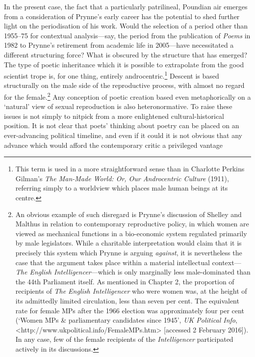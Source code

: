 \documentclass[]{article}
\begin{document}
In the present case, the fact that a particularly patrilineal, Poundian
air emerges from a consideration of Prynne’s early career has the
potential to shed further light on the periodisation of his work. Would
the selection of a period other than 1955–75 for contextual
analysis—say, the period from the publication of \emph{Poems} in 1982 to
Prynne’s retirement from academic life in 2005—have necessitated a
different structuring force? What is obscured by the structure that has
emerged? The type of poetic inheritance which it is possible to
extrapolate from the good scientist trope is, for one thing, entirely
androcentric.\footnote{This term is used in a more straightforward sense
  than in Charlotte Perkins Gilman’s \emph{The Man-Made World: Or, Our
  Androcentric Culture} (1911), referring simply to a worldview which
  places male human beings at its centre.} Descent is based structurally
on the male side of the reproductive process, with almost no regard for
the female.\footnote{An obvious example of such disregard is Prynne’s
  discussion of Shelley and Malthus in relation to contemporary
  reproductive policy, in which women are viewed as mechanical functions
  in a bio-economic system regulated primarily by male legislators.
  While a charitable interpretation would claim that it is precisely
  this system which Prynne is arguing \emph{against}, it is nevertheless
  the case that the argument takes place within a material intellectual
  context—\emph{The English Intelligencer}—which is only marginally less
  male-dominated than the 44th Parliament itself. As mentioned in
  Chapter 2, the proportion of recipients of \emph{The English
  Intelligencer} who were women was, at the height of its admittedly
  limited circulation, less than seven per cent. The equivalent rate for
  female MPs after the 1966 election was approximately four per cent
  (‘Women MPs \& parliamentary candidates since 1945’, \emph{UK
  Political Info},
  \textless{}http://www.ukpolitical.info/FemaleMPs.htm\textgreater{}
  {[}accessed 2 February 2016{]}). In any case, few of the female
  recipients of the \emph{Intelligencer} participated actively in its
  discussions.} Any conception of poetic creation based even
metaphorically on a ‘natural’ view of sexual reproduction is also
heteronormative. To raise these issues is not simply to nitpick from a
more enlightened cultural-historical position. It is not clear that
poets’ thinking about poetry can be placed on an ever-advancing
political timeline, and even if it could it is not obvious that any
advance which would afford the contemporary critic a privileged vantage
\end{document}
